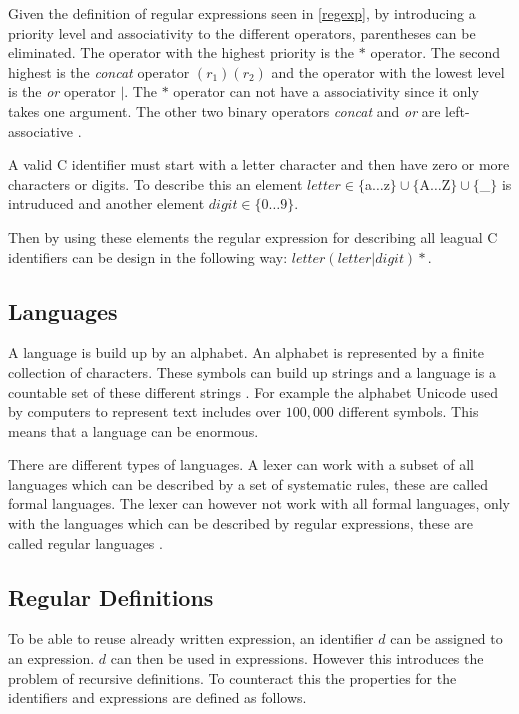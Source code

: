 Given the definition of regular expressions seen in \cref{regexp},
by introducing a priority level and associativity to the different operators,
parentheses can be eliminated. The operator with the highest priority is the $*$
operator. The second highest is the \emph{concat} operator $(r_1)(r_2)$ and the
operator with the lowest level is the \emph{or} operator $|$. The $*$ operator
can not have a associativity since it only takes one argument. The other two
binary operators \emph{concat} and \emph{or} are left-associative
\cite{Aho1990}.
\newline
\begin{example}\label{regexpEx}
A valid C identifier must start with a letter character and then have zero or more characters or digits. To describe this an element $letter
\in \{$a$ \dots $z$\} \cup \{$A$ \dots $Z$\} \cup \{$\_$\}$ is intruduced and
another element $digit \in \{0 \dots 9\}$.

Then by using these elements the regular expression for describing all leagual C
identifiers can be design in the following way: $letter (letter | digit)*$.
\end{example}

\subsection{Languages}
A language is build up by an alphabet. An alphabet is represented by a finite
collection of characters. These symbols can build up strings and a language is
a countable set of these different strings \cite{Aho2006}. For example the
alphabet Unicode used by computers to represent text includes over $100,000$
different symbols. This means that a language can be enormous.

There are different types of languages. A lexer can work with a subset of all
languages which can be described by a set of systematic rules, these are called
formal languages. The lexer can however not work with all formal languages, only
with the languages which can be described by regular expressions, these are
called regular languages \cite{Ranta2012}.

\subsection{Regular Definitions}
To be able to reuse already written expression, an identifier $d$ can be
assigned to an expression. $d$ can then be used in expressions. However
this introduces the problem of recursive definitions. To counteract this
the properties for the identifiers and expressions are defined as follows.

